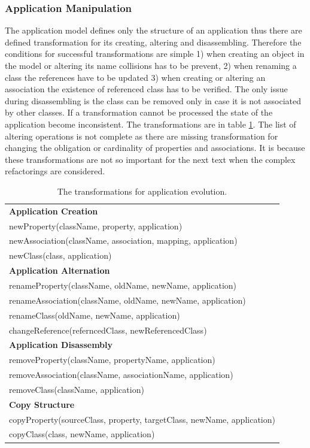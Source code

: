 \documentclass[11pt]{article}
\begin{document}

\subsubsection{Application Manipulation}
\label{sec:app-evolution}
The application model defines only the structure of an application thus there are defined transformation for its creating, altering and disassembling. Therefore the conditions for successful transformations are simple 1) when creating an object in the model or altering its name collisions has to be prevent, 2) when renaming a class the references have to be updated 3) when creating or altering an association the existence of referenced class has to be verified. The only issue during disassembling is the class can be removed only in case it is not associated by other classes. If a transformation cannot be processed the state of the application become inconsistent. The transformations are in table \ref{tab:app-evolution}. The list of altering operations is not complete as there are missing transformation for changing the obligation or cardinality of properties and associations. It is because these transformations are not so important for the next text when the complex refactorings are considered. 
\begin{table}
\centering
	\begin{tabular}{|l|}
	\hline
	\textbf{Application Creation} \\
	newProperty(className, property, application) \\
	newAssociation(className, association, mapping, application) \\
	newClass(class, application) \\
	\textbf{Application Alternation} \\
	renameProperty(className, oldName, newName, application) \\
	renameAssociation(className, oldName, newName, application) \\
	renameClass(oldName, newName, application)\\
	changeReference(referncedClass, newReferencedClass) \\
	\textbf{Application Disassembly} \\
	removeProperty(className, propertyName, application) \\
	removeAssociation(className, associationName, application) \\
	removeClass(className, application)\\
	\textbf{Copy Structure}\\
	copyProperty(sourceClass, property, targetClass, newName, application)  \\
	copyClass(class, newName, application) \\
	\hline
	\end{tabular}
	\caption{The transformations for application evolution.}
	\label{tab:app-evolution}
\end{table}
\end{document}
